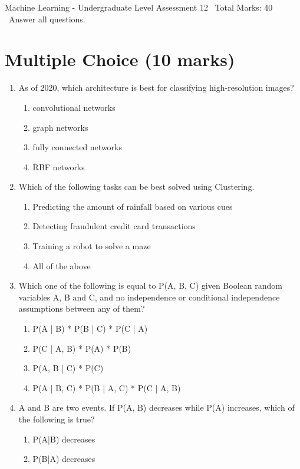 \documentclass[12pt]{article}
\begin{document}
\begin{center}
Machine Learning - Undergraduate Level Assessment 12 \
Total Marks: 40 \
Answer all questions.
\end{center}

\section*{Multiple Choice (10 marks)}
\begin{enumerate}[label=\arabic*.]
\item As of 2020, which architecture is best for classifying high-resolution images?
\begin{enumerate}[label=(\alph*)]
    \item convolutional networks
    \item graph networks
    \item fully connected networks
    \item RBF networks
\end{enumerate}
\item Which of the following tasks can be best solved using Clustering.
\begin{enumerate}[label=(\alph*)]
    \item Predicting the amount of rainfall based on various cues
    \item Detecting fraudulent credit card transactions
    \item Training a robot to solve a maze
    \item All of the above
\end{enumerate}
\item Which one of the following is equal to P(A, B, C) given Boolean random variables A, B and C, and no independence or conditional independence assumptions between any of them?
\begin{enumerate}[label=(\alph*)]
    \item P(A | B) * P(B | C) * P(C | A)
    \item P(C | A, B) * P(A) * P(B)
    \item P(A, B | C) * P(C)
    \item P(A | B, C) * P(B | A, C) * P(C | A, B)
\end{enumerate}
\item A and B are two events. If P(A, B) decreases while P(A) increases, which of the following is true?
\begin{enumerate}[label=(\alph*)]
    \item P(A|B) decreases
    \item P(B|A) decreases

\end{enumerate}
\end{enumerate}
\end{document}
